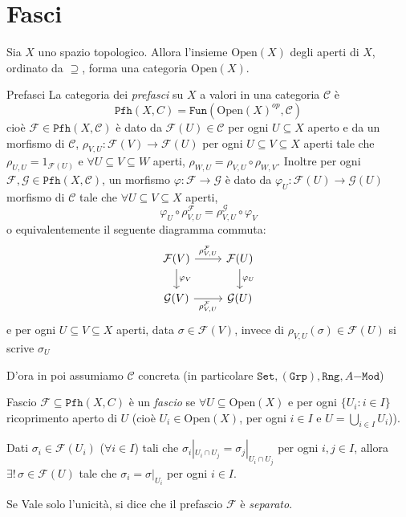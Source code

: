 \chapter{Fasci}

Sia \(X\) uno spazio topologico. Allora l'insieme \(\mathrm{Open}{(X)}\) degli
aperti di \(X\), ordinato da \(\supseteq\), forma una categoria
\(\mathrm{Open}{(X)}\).

\begin{definition}{Prefasci}
    La categoria dei \emph{prefasci} su \(X\) a valori in una categoria
    \(\mathcal{C}\) è 
    \[
      \mathtt{Pfh}{(X, C)} = \mathtt{Fun}{(\mathrm{Open}{(X)}^{op}, \mathcal{C})}
    \]
    cioè \(\mathcal{F} \in \mathtt{Pfh}{(X, \mathcal{C})}\) è dato da
    \(\mathcal{F}{(U)} \in \mathcal{C}\) per ogni \(U \subseteq X \) aperto e da
    un morfismo di \(\mathcal{C}\), \(\rho_{V,U} : \mathcal{F}{(V)} \to
    \mathcal{F}{(U)}\) per ogni \(U \subseteq V \subseteq X  \) aperti tale che
    \(\rho_{U,U} = 1_{\mathcal{F}{(U)}} \) e \(\forall U \subseteq V \subseteq W
    \) aperti, \(\rho_{W, U} = \rho_{V, U} \circ \rho_{W, V} \). Inoltre per
    ogni \(\mathcal{F}, \mathcal{G} \in \mathtt{Pfh}{(X, \mathcal{C})}\), un
    morfismo \(\varphi  : \mathcal{F} \to \mathcal{G}\) è dato da \(\varphi_{U}
    : \mathcal{F}{(U)} \to \mathcal{G}{(U)}\) morfismo di \(\mathcal{C}\) tale
    che \(\forall U \subseteq V \subseteq X  \) aperti, 
    \[
      \varphi_U \circ \rho_{V,U} ^{\mathcal{F}} = \rho_{V, U} ^{\mathcal{G}}
      \circ \varphi_V
    \]
    o equivalentemente il seguente diagramma commuta:
\[\begin{tikzcd}
	{\mathcal{F}{(V)}} & {\mathcal{F}{(U)}} \\
    {\mathcal{G}{(V)}} & {\mathcal{G}{(U)}}
	\arrow["{\rho_{V,U} ^{\mathcal{F}}}", from=1-1, to=1-2]
	\arrow["\varphi_V", from=1-1, to=2-1]
	\arrow["\varphi_U", from=1-2, to=2-2]
	\arrow["\rho_{V,U} ^{\mathcal{F}}"', from=2-1, to=2-2]
\end{tikzcd}\]
    e per ogni \(U \subseteq V \subseteq X  \) aperti, data \(\sigma \in
    \mathcal{F}{(V)}\), invece di \(\rho_{V,U} {(\sigma)} \in \mathcal{F}{(U)}\)
    si scrive \(\sigma_{U}\) 
\end{definition}
D'ora in poi assumiamo \(\mathcal{C}\) concreta (in particolare \(\mathtt{Set},
{(\mathtt{Grp})}, \mathtt{Rng}, A\mathtt{-Mod}\))

\begin{definition}{Fascio}
    \(\mathcal{F} \subseteq \mathtt{Pfh}{(X, C)} \) è un \emph{fascio} se
    \(\forall U \subseteq \mathrm{Open}{(X)} \) e per ogni \(\{U_{i}: i \in I\}
    \) ricoprimento aperto di \(U\) (cioè \(U_{i} \in \mathrm{Open}{(X)}\), per
    ogni \(i \in I\) e \(U = \bigcup_{i \in I} U_{i}\))).

    Dati \(\sigma_{i} \in \mathcal{F}{(U_{i})}\) (\(\forall i \in I\)) tali che
    \(\sigma_{i} |_{U_{i} \cap U_{j}} = \sigma_{j} |_{U_{i} \cap U_{j}} \) per
    ogni \(i, j \in I\), allora \(\exists ! \, \sigma \in \mathcal{F}{(U)}\)
    tale che \(\sigma_{i} = \sigma|_{U_{i}} \) per ogni \(i \in I\).

    Se Vale solo l'unicità, si dice che il prefascio \(\mathcal{F}\) è
    \emph{separato}.
\end{definition}

